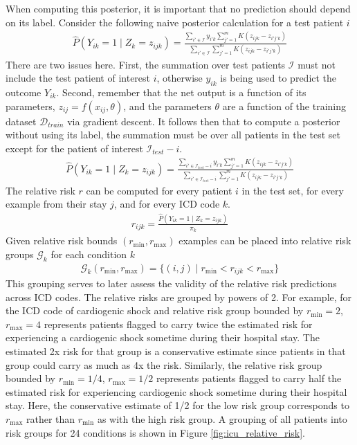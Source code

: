 When computing this posterior, it is important that no prediction should depend on its label.  Consider the following naive posterior calculation for a test patient $i$
\begin{gather}
    \hat{P}(Y_{ik} = 1 \mid Z_k = z_{ijk}) = \frac
        {\sum_{i' \in \mathcal{I}} y_{i'k} \sum_{j'=1}^m K(z_{ijk} - z_{i'j'k})}
        {\sum_{i' \in \mathcal{I}} \sum_{j'=1}^m K(z_{ijk} - z_{i'j'k})}
\end{gather}
There are two issues here.  First, the summation over test patients $\mathcal{I}$ must not include the test patient of interest $i$, otherwise $y_{ik}$ is being used to predict the outcome $Y_{ik}$.  Second, remember that the net output is a function of its parameters, $z_{ij} = f(x_{ij}, \theta)$, and the parameters $\theta$ are a function of the training dataset $\mathcal{D}_{train}$ via gradient descent.  It follows then that to compute a posterior without using its label, the summation must be over all patients in the test set except for the patient of interest $\mathcal{I}_{test} - i$.
\begin{gather}
    \hat{P}(Y_{ik} = 1 \mid Z_k = z_{ijk}) = \frac
        {\sum_{i' \in \mathcal{I}_{test} - i} y_{i'k} \sum_{j'=1}^m K(z_{ijk} - z_{i'j'k})}
        {\sum_{i' \in \mathcal{I}_{test} - i} \sum_{j'=1}^m K(z_{ijk} - z_{i'j'k})}
\end{gather}
The relative risk $r$ can be computed for every patient $i$ in the test set, for every example from their stay $j$, and for every ICD code $k$.
\begin{gather}
    r_{ijk} = \frac
        {\hat{P}(Y_{ik} = 1 \mid Z_k = z_{ijk})}
        {\pi_k}
\end{gather}
Given relative risk bounds $(r_{\min}, r_{\max})$ examples can be placed into relative risk groups $\mathcal{G}_k$ for each condition $k$
\begin{gather}
    \mathcal{G}_k(r_{\min}, r_{\max}) = \{ (i, j) \mid r_{\min} < r_{ijk} < r_{\max} \}
\end{gather}
This grouping serves to later assess the validity of the relative risk predictions across ICD codes.  The relative risks are grouped by powers of 2.  For example, for the ICD code of cardiogenic shock and relative risk group bounded by $r_{\min} = 2$, $r_{\max} = 4$ represents patients flagged to carry twice the estimated risk for experiencing a cardiogenic shock sometime during their hospital stay.  The estimated 2x risk for that group is a conservative estimate since patients in that group could carry as much as 4x the risk.  Similarly, the relative risk group bounded by $r_{\min} = 1/4$, $r_{\max} = 1/2$ represents patients flagged to carry half the estimated risk for experiencing cardiogenic shock sometime during their hospital stay.  Here, the conservative estimate of 1/2 for the low risk group corresponds to $r_{\max}$ rather than $r_{\min}$ as with the high risk group.  A grouping of all patients into risk groups for 24 conditions is shown in Figure \ref{fig:icu_relative_risk}.

